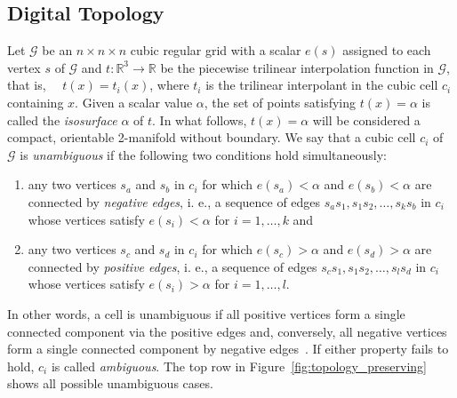 \subsection{Digital Topology}
\label{sec:digital-topology}

Let $\mathcal{G}$ be an $n\times n \times n$ cubic regular grid with a
scalar $e(s)$ assigned to each vertex $s$ of $\mathcal{G}$ and
$t:\mathbb{R}^3\rightarrow\mathbb{R}$ be the piecewise trilinear
interpolation function in $\mathcal{G}$, that is, ~~$t(x) = t_i(x)$,
where $t_i$ is the trilinear interpolant in the cubic cell $c_i$
containing $x$.
%
Given a scalar value $\alpha$, the set of points satisfying
$t(x)=\alpha$ is called the \emph{isosurface} $\alpha$ of $t$. In what
follows, $t(x)=\alpha$ will be considered a compact, orientable
2-manifold without boundary.
We say that a cubic cell $c_i$ of $\mathcal{G}$ is \emph{unambiguous}
if the following two conditions hold simultaneously:
\begin{enumerate}[topsep=0px,partopsep=0px,itemsep=0px,parsep=0px]
\item any two vertices $s_a$ and $s_b$ in $c_i$ for which
  $e(s_a)<\alpha$ and $ e(s_b)<\alpha$ are connected by \emph{negative
  edges}, i. e., a sequence of edges $s_as_1,s_1s_2,\ldots,s_ks_b$ in
  $c_i$ whose vertices satisfy $e(s_i)<\alpha$ for $i=1,\ldots, k$ and
\item any two vertices $s_c$ and $s_d$ in $c_i$ for which
  $e(s_c)>\alpha$ and $e(s_d)>\alpha$ are connected by \emph{positive
  edges}, i. e., a sequence of edges $s_cs_1,s_1s_2,\ldots,s_ls_d$ in
  $c_i$ whose vertices satisfy $e(s_i)>\alpha$ for $i=1,\ldots,l$.
\end{enumerate}
 In other words, a cell is unambiguous if all positive vertices form a
 single connected component via the positive edges and, conversely, all
 negative vertices form a single connected component by negative
 edges~\cite{gelder:tog:1994}.  If either property fails to hold, $c_i$ is called \emph{ambiguous}. The top
 row in Figure~\ref{fig:topology_preserving} shows all possible
 unambiguous cases.

